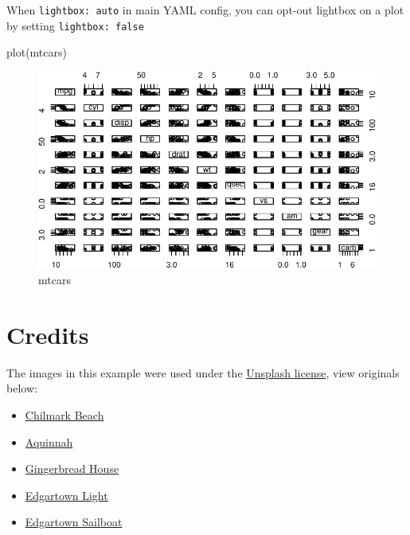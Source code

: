 \documentclass[
  a4paper,
  DIV=11,
  numbers=noendperiod,
  oneside,
  open=any]{scrreprt}
\newenvironment{Shaded}{\begin{snugshade}}{\end{snugshade}}
\newcommand{\FunctionTok}[1]{\textcolor[rgb]{0.28,0.35,0.67}{#1}}
\newcommand{\NormalTok}[1]{\textcolor[rgb]{0.00,0.23,0.31}{#1}}
\providecommand{\tightlist}{%
  \setlength{\itemsep}{0pt}\setlength{\parskip}{0pt}}\usepackage{longtable,booktabs,array}
\begin{document}
When \texttt{lightbox:\ auto} in main YAML config, you can opt-out
lightbox on a plot by setting \texttt{lightbox:\ false}

\begin{Shaded}
\begin{Highlighting}[]
\FunctionTok{plot}\NormalTok{(mtcars)}
\end{Highlighting}
\end{Shaded}

\begin{figure}[H]

{\centering \includegraphics{lightbox_files/figure-pdf/unnamed-chunk-4-1.pdf}

}

\caption{mtcars}

\end{figure}%

\section{Credits}\label{credits}

The images in this example were used under the
\href{https://unsplash.com/license}{Unsplash license}, view originals
below:

\begin{itemize}
\tightlist
\item
  \href{https://unsplash.com/photos/VBDJGOMCwps}{Chilmark Beach}
\item
  \href{https://unsplash.com/photos/2iQnDPLIXwU}{Aquinnah}
\item
  \href{https://unsplash.com/photos/HQEtvlNzUyA}{Gingerbread House}
\item
  \href{https://unsplash.com/photos/f59MyOfLpi8}{Edgartown Light}
\item
  \href{https://unsplash.com/photos/IiLiz7XpQpI}{Edgartown Sailboat}
\end{itemize}
\end{document}
